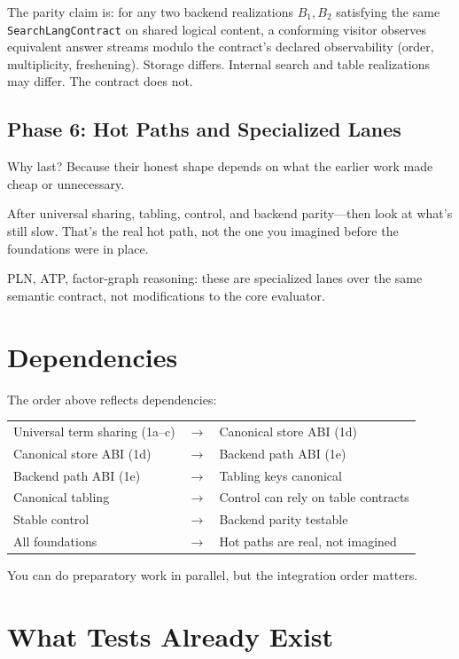 \documentclass[11pt]{article}
\newcommand{\code}[1]{\texttt{#1}}
\begin{document}
The parity claim is: for any two backend realizations $B_1, B_2$
satisfying the same \code{SearchLangContract} on shared logical
content, a conforming visitor observes equivalent answer streams
modulo the contract's declared observability (order, multiplicity,
freshening).  Storage differs.  Internal search and table
realizations may differ.  The contract does not.

\subsection{Phase 6: Hot Paths and Specialized Lanes}

Why last?  Because their honest shape depends on what the earlier work
made cheap or unnecessary.

After universal sharing, tabling, control, and backend parity---then
look at what's still slow.  That's the real hot path, not the one you
imagined before the foundations were in place.

PLN, ATP, factor-graph reasoning: these are specialized lanes over the
same semantic contract, not modifications to the core evaluator.

\section{Dependencies}

The order above reflects dependencies:

\begin{center}
\begin{tabular}{lcl}
Universal term sharing (1a--c) & $\rightarrow$ & Canonical store ABI (1d) \\
Canonical store ABI (1d) & $\rightarrow$ & Backend path ABI (1e) \\
Backend path ABI (1e) & $\rightarrow$ & Tabling keys canonical \\
Canonical tabling & $\rightarrow$ & Control can rely on table contracts \\
Stable control & $\rightarrow$ & Backend parity testable \\
All foundations & $\rightarrow$ & Hot paths are real, not imagined
\end{tabular}
\end{center}

You can do preparatory work in parallel, but the integration order
matters.

\section{What Tests Already Exist}
\end{document}
